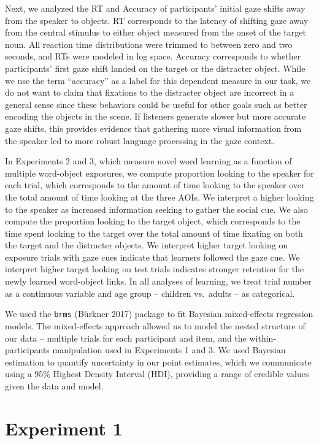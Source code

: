 \documentclass[10pt, letterpaper]{article}
\begin{document}
Next, we analyzed the RT and Accuracy of participants' initial gaze
shifts away from the speaker to objects. RT corresponds to the latency
of shifting gaze away from the central stimulus to either object
measured from the onset of the target noun. All reaction time
distributions were trimmed to between zero and two seconds, and RTs were
modeled in log space. Accuracy corresponds to whether participants'
first gaze shift landed on the target or the distracter object. While we
use the term ``accuracy'' as a label for this dependent measure in our
task, we do not want to claim that fixations to the distracter object
are incorrect in a general sense since these behaviors could be useful
for other goals such as better encoding the objects in the scene. If
listeners generate slower but more accurate gaze shifts, this provides
evidence that gathering more visual information from the speaker led to
more robust language processing in the gaze context.

In Experiments 2 and 3, which measure novel word learning as a function
of multiple word-object exposures, we compute proportion looking to the
speaker for each trial, which corresponds to the amount of time looking
to the speaker over the total amount of time looking at the three AOIs.
We interpret a higher looking to the speaker as increased information
seeking to gather the social cue. We also compute the proportion looking
to the target object, which corresponds to the time spent looking to the
target over the total amount of time fixating on both the target and the
distracter objects. We interpret higher target looking on exposure
trials with gaze cues indicate that learners followed the gaze cue. We
interpret higher target looking on test trials indicates stronger
retention for the newly learned word-object links. In all analyses of
learning, we treat trial number as a continuous variable and age group
-- children vs.~adults -- as categorical.

We used the \texttt{brms} (Bürkner 2017) package to fit Bayesian
mixed-effects regression models. The mixed-effects approach allowed us
to model the nested structure of our data -- multiple trials for each
participant and item, and the within-participants manipulation used in
Experiments 1 and 3. We used Bayesian estimation to quantify uncertainty
in our point estimates, which we communicate using a 95\% Highest
Density Interval (HDI), providing a range of credible values given the
data and model.

\hypertarget{experiment-1}{%
\section{Experiment 1}\label{experiment-1}}
\end{document}
